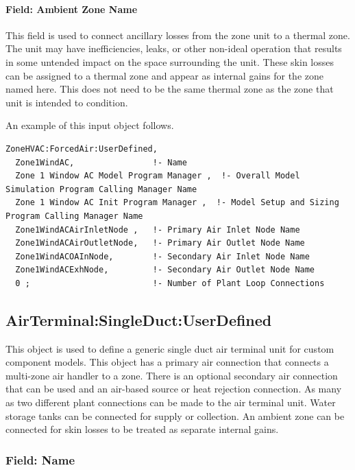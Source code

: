 \paragraph{Field: Ambient Zone Name}\label{field-ambient-zone-name}

This field is used to connect ancillary losses from the zone unit to a thermal zone. The unit may have inefficiencies, leaks, or other non-ideal operation that results in some untended impact on the space surrounding the unit. These skin losses can be assigned to a thermal zone and appear as internal gains for the zone named here. This does not need to be the same thermal zone as the zone that unit is intended to condition.

An example of this input object follows.

\begin{lstlisting}
ZoneHVAC:ForcedAir:UserDefined,
  Zone1WindAC,                !- Name
  Zone 1 Window AC Model Program Manager ,  !- Overall Model Simulation Program Calling Manager Name
  Zone 1 Window AC Init Program Manager ,  !- Model Setup and Sizing Program Calling Manager Name
  Zone1WindACAirInletNode ,   !- Primary Air Inlet Node Name
  Zone1WindACAirOutletNode,   !- Primary Air Outlet Node Name
  Zone1WindACOAInNode,        !- Secondary Air Inlet Node Name
  Zone1WindACExhNode,         !- Secondary Air Outlet Node Name
  0 ;                         !- Number of Plant Loop Connections
\end{lstlisting}

\subsection{AirTerminal:SingleDuct:UserDefined}\label{airterminalsingleductuserdefined}

This object is used to define a generic single duct air terminal unit for custom component models. This object has a primary air connection that connects a multi-zone air handler to a zone. There is an optional secondary air connection that can be used and an air-based source or heat rejection connection. As many as two different plant connections can be made to the air terminal unit. Water storage tanks can be connected for supply or collection. An ambient zone can be connected for skin losses to be treated as separate internal gains.

\subsubsection{Field: Name}\label{field-name-1-046}


